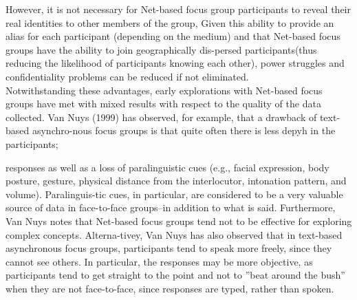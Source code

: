 \documentclass[a4,9pt]{beamer}
\begin{document}
\begin{frame}
 However, it is not necessary for Net-based focus group participants to reveal their real identities to other members of the group, Given this ability to provide an alias for each participant (depending on the medium) and that Net-based focus groups have the ability to join geographically dis-persed participants(thus reducing the likelihood of participants knowing each other), power struggles and confidentiality problems can be reduced if not eliminated.\\
\hspace*{0.5cm} Notwithstanding these advantages, early explorations with Net-based focus groups have met with mixed results with respect to the quality of the data collected. Van Nuys (1999) has observed, for example, that a drawback of text-based asynchro-nous focus groups is that quite often there is less depyh in the participants;
\end{frame}

\begin{frame}
responses as well as a loss of paralinguistic cues (e.g., facial expression, body posture, gesture, physical distance from the interlocutor, intonation pattern, and volume). Paralinguis-tic cues, in particular, are considered to be a very valuable source of data in face-to-face groups--in addition to what is said. Furthermore, Van Nuys notes that Net-based focus groups tend not to be effective for exploring complex concepts. Alterna-tivey, Van Nuys has also observed that in text-based asynchronous focus groups, participants tend to speak more freely, since they cannot see others. In particular, the responses may be more objective, as participants tend to get straight to the point and not to ''beat around the bush'' when they are not face-to-face, since responses are typed, rather than spoken.\\

\end{frame}
\end{document}
